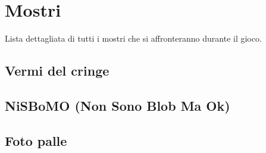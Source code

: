 \section{Mostri}

    Lista dettagliata di tutti i mostri che si affronteranno durante il gioco.
    
    \subsection{Vermi del cringe}
    
    \subsection{NiSBoMO (Non Sono Blob Ma Ok)}
    
    \subsection{Foto palle}
